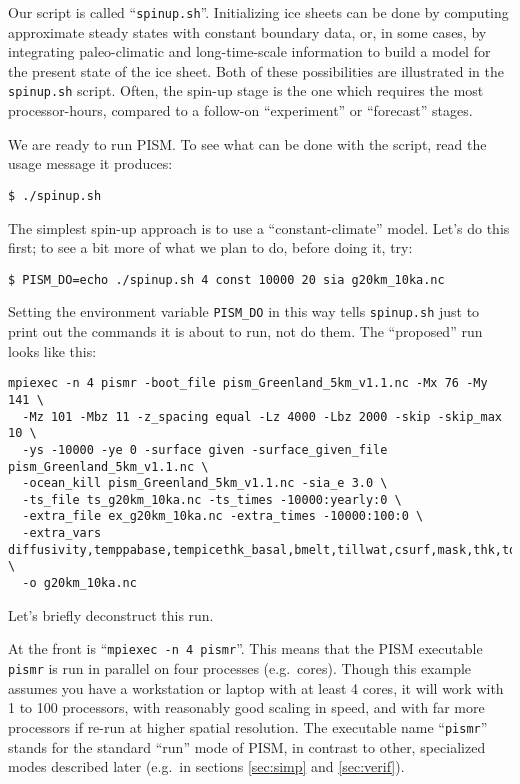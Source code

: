 Our script is called ``\texttt{spinup.sh}''.  Initializing ice sheets can be done by computing approximate steady states with constant boundary data, or, in some cases, by integrating paleo-climatic and long-time-scale information to build a model for the present state of the ice sheet.  Both of these possibilities are illustrated in the \texttt{spinup.sh} script.  Often, the spin-up stage is the one which requires the most processor-hours, compared to a follow-on ``experiment'' or ``forecast'' stages.

We are ready to run PISM.  To see what can be done with the script, read the usage message it produces:
\begin{verbatim}
$ ./spinup.sh
\end{verbatim}
The simplest spin-up approach is to use a ``constant-climate'' model.  Let's do this first; to see a bit more of what we plan to do, before doing it, try:
\begin{verbatim}
$ PISM_DO=echo ./spinup.sh 4 const 10000 20 sia g20km_10ka.nc
\end{verbatim}
Setting the environment variable \texttt{PISM_DO} in this way tells \texttt{spinup.sh} just to print out the commands it is about to run, not do them.  The ``proposed'' run looks like this:
\small
\begin{verbatim}
mpiexec -n 4 pismr -boot_file pism_Greenland_5km_v1.1.nc -Mx 76 -My 141 \
  -Mz 101 -Mbz 11 -z_spacing equal -Lz 4000 -Lbz 2000 -skip -skip_max 10 \
  -ys -10000 -ye 0 -surface given -surface_given_file pism_Greenland_5km_v1.1.nc \
  -ocean_kill pism_Greenland_5km_v1.1.nc -sia_e 3.0 \
  -ts_file ts_g20km_10ka.nc -ts_times -10000:yearly:0 \
  -extra_file ex_g20km_10ka.nc -extra_times -10000:100:0 \
  -extra_vars diffusivity,temppabase,tempicethk_basal,bmelt,tillwat,csurf,mask,thk,topg,usurf \
  -o g20km_10ka.nc
\end{verbatim}
\normalsize
Let's briefly deconstruct this run.

At the front is ``\texttt{mpiexec -n 4 pismr}''.  This means that the PISM executable \texttt{pismr} is run in parallel on four processes (e.g.~cores).  Though this example assumes you have a workstation or laptop with at least 4 cores, it will work with 1 to 100 processors, with reasonably good scaling in speed, and with far more processors if re-run at higher spatial resolution.  The executable name ``\texttt{pismr}'' stands for the standard ``run'' mode of PISM, in contrast to other, specialized modes described later (e.g.~in sections \ref{sec:simp} and \ref{sec:verif}).

